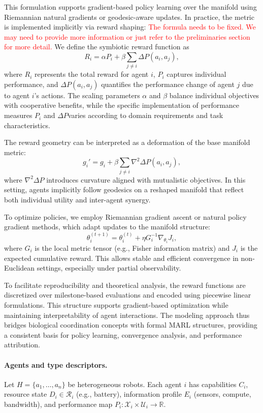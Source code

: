 This formulation supports gradient-based policy learning over the manifold using Riemannian natural gradients or geodesic-aware updates. In practice, the metric is implemented implicitly via reward shaping:
\textcolor{red}{The formula needs to be fixed. We may need to provide more information or just refer to the preliminaries section for more detail.}
We define the symbiotic reward function as
\[
R_i = \alpha P_i + \beta \sum_{j \neq i} \Delta P(a_i, a_j),
\]
where $R_i$ represents the total reward for agent $i$, $P_i$ captures individual performance, and $\Delta P(a_i, a_j)$ quantifies the performance change of agent $j$ due to agent $i$'s actions. The scaling parameters $\alpha$ and $\beta$ balance individual objectives with cooperative benefits, while the specific implementation of performance measures $P_i$ and $\Delta P$varies according to domain requirements and task characteristics.

The reward geometry can be interpreted as a deformation of the base manifold metric:
\[
g_i' = g_i + \beta \sum_{j \neq i} \nabla^2 \Delta P(a_i, a_j),
\]
where $\nabla^2 \Delta P$ introduces curvature aligned with mutualistic objectives. In this setting, agents implicitly follow geodesics on a reshaped manifold that reflect both individual utility and inter-agent synergy.

To optimize policies, we employ Riemannian gradient ascent or natural policy gradient methods, which adapt updates to the manifold structure:
\[
\theta_i^{(t+1)} = \theta_i^{(t)} + \eta G_i^{-1} \nabla_{\theta_i} J_i,
\]
where $G_i$ is the local metric tensor (e.g., Fisher information matrix) and $J_i$ is the expected cumulative reward. This allows stable and efficient convergence in non-Euclidean settings, especially under partial observability.

To facilitate reproducibility and theoretical analysis, the reward functions are discretized over milestone-based evaluations and encoded using piecewise linear formulations. This structure supports gradient-based optimization while maintaining interpretability of agent interactions. The modeling approach thus bridges biological coordination concepts with formal MARL structures, providing a consistent basis for policy learning, convergence analysis, and performance attribution.


\paragraph{Agents and type descriptors.}
Let $H=\{a_1,\dots,a_n\}$ be heterogeneous robots. Each agent $i$ has
capabilities $C_i$, resource state $D_i\in\mathcal{R}_i$ (e.g., battery),
information profile $E_i$ (sensors, compute, bandwidth), and performance map
$P_i:\mathcal{X}_i\times\mathcal{U}_i\to\mathbb{R}$.

